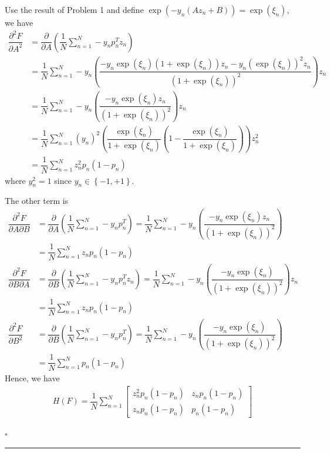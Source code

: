 \documentclass[12pt]{article}
\newcommand*{\QEDB}{\hfill\ensuremath{\square}}
\newcommand{\CBrackets}[1]{\left\{#1\right\}}
\newcommand{\SBrackets}[1]{\left[#1\right]}
\newcommand{\ParTh}[1]{\left(#1\right)}
\newcommand{\Matrix}[2]{\SBrackets{\begin{array}{#1}#2\end{array}}}
\newcommand{\horrule}[1]{\rule{\linewidth}{#1}}
\begin{document}
Use the result of Problem 1 and define $\exp\ParTh{-y_n\ParTh{Az_n+B}}=\exp\ParTh{\xi_n}$, we have
\begin{align}
\dfrac{\partial^2F}{\partial A^2}&=\dfrac{\partial}{\partial A}\ParTh{\dfrac{1}{N}\sum_{n=1}^{N}-y_np^T_nz_n}\\
&=\dfrac{1}{N}\sum_{n=1}^{N}-y_n\ParTh{\dfrac{-y_n\exp\ParTh{\xi_n}\ParTh{1+\exp\ParTh{\xi_n}}z_n-y_n\ParTh{\exp\ParTh{\xi_n}}^2z_n}{\ParTh{1+\exp\ParTh{\xi_n}}^2}}z_n\\
&=\dfrac{1}{N}\sum_{n=1}^{N}-y_n\ParTh{\dfrac{-y_n\exp\ParTh{\xi_n}z_n}{\ParTh{1+\exp\ParTh{\xi_n}}^2}}z_n\\
&=\dfrac{1}{N}\sum_{n=1}^{N}\ParTh{y_n}^2\ParTh{\dfrac{\exp\ParTh{\xi_n}}{1+\exp\ParTh{\xi_n}}\ParTh{1-\dfrac{\exp\ParTh{\xi_n}}{1+\exp\ParTh{\xi_n}}}}z^2_n\\
&=\dfrac{1}{N}\sum_{n=1}^{N}z^2_np_n\ParTh{1-p_n}
\end{align}
where $y^2_n=1$ since $y_n\in\CBrackets{-1,+1}$.

The other term is
\begin{align}
\dfrac{\partial^2F}{\partial A\partial B}&=\dfrac{\partial}{\partial A}\ParTh{\dfrac{1}{N}\sum_{n=1}^{N}-y_np^T_n}=\dfrac{1}{N}\sum_{n=1}^{N}-y_n\ParTh{\dfrac{-y_n\exp\ParTh{\xi_n}z_n}{\ParTh{1+\exp\ParTh{\xi_n}}^2}}\\
&=\dfrac{1}{N}\sum_{n=1}^{N}z_np_n\ParTh{1-p_n}\\
\dfrac{\partial^2F}{\partial B\partial A}&=\dfrac{\partial}{\partial B}\ParTh{\dfrac{1}{N}\sum_{n=1}^{N}-y_np^T_nz_n}=\dfrac{1}{N}\sum_{n=1}^{N}-y_n\ParTh{\dfrac{-y_n\exp\ParTh{\xi_n}}{\ParTh{1+\exp\ParTh{\xi_n}}^2}}z_n\\
&=\dfrac{1}{N}\sum_{n=1}^{N}z_np_n\ParTh{1-p_n}\\
\dfrac{\partial^2F}{\partial B^2}&=\dfrac{\partial}{\partial B}\ParTh{\dfrac{1}{N}\sum_{n=1}^{N}-y_np^T_n}=\dfrac{1}{N}\sum_{n=1}^{N}-y_n\ParTh{\dfrac{-y_n\exp\ParTh{\xi_n}}{\ParTh{1+\exp\ParTh{\xi_n}}^2}}\\
&=\dfrac{1}{N}\sum_{n=1}^{N}p_n\ParTh{1-p_n}
\end{align}
Hence, we have
\begin{align}
H\ParTh{F}=\dfrac{1}{N}\sum_{n=1}^{N}\Matrix{cc}{z^2_np_n\ParTh{1-p_n}&z_np_n\ParTh{1-p_n}\\z_np_n\ParTh{1-p_n}&p_n\ParTh{1-p_n}}
\end{align}

\QEDB

\horrule{0.5pt}
\end{document}
